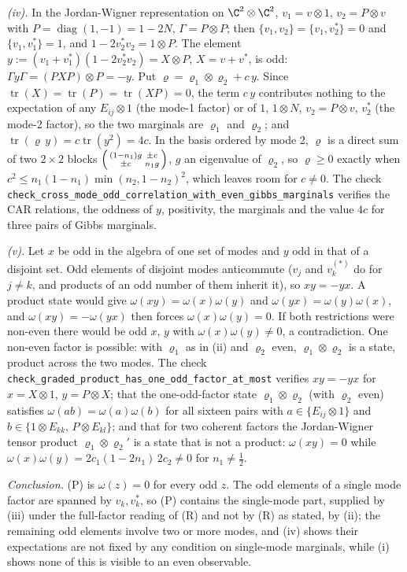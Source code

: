 \emph{(iv).} In the Jordan-Wigner representation on $\C^2 \otimes \C^2$, $v_1 = v \otimes 1$, $v_2 = P \otimes v$ with $P = \operatorname{diag}(1, -1) = 1 - 2N$, $\Gamma = P \otimes P$; then $\{v_1, v_2\} = \{v_1, v_2^{*}\} = 0$ and $\{v_1, v_1^{*}\} = 1$, and $1 - 2v_2^{*}v_2 = 1 \otimes P$. The element $y := (v_1 + v_1^{*})(1 - 2v_2^{*}v_2) = X \otimes P$, $X = v + v^{*}$, is odd: $\Gamma y \Gamma = (PXP) \otimes P = -y$. Put $\varrho = \varrho_1 \otimes \varrho_2 + c\,y$. Since $\operatorname{tr}(X) = \operatorname{tr}(P) = \operatorname{tr}(XP) = 0$, the term $c\,y$ contributes nothing to the expectation of any $E_{ij} \otimes 1$ (the mode-1 factor) or of $1$, $1 \otimes N$, $v_2 = P \otimes v$, $v_2^{*}$ (the mode-2 factor), so the two marginals are $\varrho_1$ and $\varrho_2$; and $\operatorname{tr}(\varrho\, y) = c\operatorname{tr}(y^2) = 4c$. In the basis ordered by mode 2, $\varrho$ is a direct sum of two $2 \times 2$ blocks $\begin{psmallmatrix} (1-n_1)g & \pm c \\ \pm c & n_1 g\end{psmallmatrix}$, $g$ an eigenvalue of $\varrho_2$, so $\varrho \geq 0$ exactly when $c^2 \leq n_1(1 - n_1)\min(n_2, 1 - n_2)^2$, which leaves room for $c \neq 0$. The check \texttt{check\_cross\_mode\_odd\_correlation\_with\_even\_gibbs\_marginals} verifies the CAR relations, the oddness of $y$, positivity, the marginals and the value $4c$ for three pairs of Gibbs marginals.

\emph{(v).} Let $x$ be odd in the algebra of one set of modes and $y$ odd in that of a disjoint set. Odd elements of disjoint modes anticommute ($v_j$ and $v_k^{(*)}$ do for $j \neq k$, and products of an odd number of them inherit it), so $xy = -yx$. A product state would give $\omega(xy) = \omega(x)\omega(y)$ and $\omega(yx) = \omega(y)\omega(x)$, and $\omega(xy) = -\omega(yx)$ then forces $\omega(x)\omega(y) = 0$. If both restrictions were non-even there would be odd $x$, $y$ with $\omega(x)\omega(y) \neq 0$, a contradiction. One non-even factor is possible: with $\varrho_1$ as in (ii) and $\varrho_2$ even, $\varrho_1 \otimes \varrho_2$ is a state, product across the two modes. The check \texttt{check\_graded\_product\_has\_one\_odd\_factor\_at\_most} verifies $xy = -yx$ for $x = X \otimes 1$, $y = P \otimes X$; that the one-odd-factor state $\varrho_1 \otimes \varrho_2$ (with $\varrho_2$ even) satisfies $\omega(ab) = \omega(a)\omega(b)$ for all sixteen pairs with $a \in \{E_{ij} \otimes 1\}$ and $b \in \{1 \otimes E_{kk},\, P \otimes E_{kl}\}$; and that for two coherent factors the Jordan-Wigner tensor product $\varrho_1 \otimes \varrho_2'$ is a state that is not a product: $\omega(xy) = 0$ while $\omega(x)\omega(y) = 2c_1(1 - 2n_1)\,2c_2 \neq 0$ for $n_1 \neq \tfrac12$.

\emph{Conclusion.} (P) is $\omega(z) = 0$ for every odd $z$. The odd elements of a single mode factor are spanned by $v_k, v_k^{*}$, so (P) contains the single-mode part, supplied by (iii) under the full-factor reading of (R) and not by (R) as stated, by (ii); the remaining odd elements involve two or more modes, and (iv) shows their expectations are not fixed by any condition on single-mode marginals, while (i) shows none of this is visible to an even observable.
